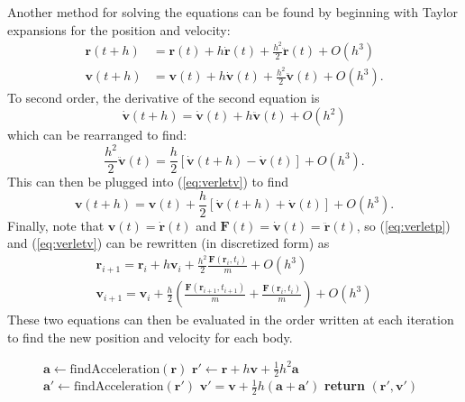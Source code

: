 \documentclass[aps,prc,reprint,nobalancelastpage]{revtex4-1}
\begin{document}
        Another method for solving the equations can be found by beginning with Taylor expansions for the position and velocity:
        \begin{align}
            \mathbf{r}(t+h) &= \mathbf{r}(t) + h \dot{\mathbf{r}}(t) + \frac{h^2}{2}\ddot{\mathbf{r}}(t) + O(h^3) \label{eq:verletp}\\
            \mathbf{v}(t+h) &= \mathbf{v}(t) + h \dot{\mathbf{v}}(t) + \frac{h^2}{2}\ddot{\mathbf{v}}(t) + O(h^3). \label{eq:verletv}
        \end{align}
        To second order, the derivative of the second equation is
        \begin{equation}
            \dot{\mathbf{v}}(t+h) = \dot{\mathbf{v}}(t) + h \ddot{\mathbf{v}}(t) + O(h^2)
        \end{equation}
        which can be rearranged to find:
        \begin{equation}
            \frac{h^2}{2}\ddot{\mathbf{v}}(t) = \frac{h}{2} [\dot{\mathbf{v}}(t+h) - \dot{\mathbf{v}}(t)] + O(h^3).
        \end{equation}
        This can then be plugged into (\ref{eq:verletv}) to find
        \begin{equation}
            \mathbf{v}(t+h) = \mathbf{v}(t) + \frac{h}{2} [\dot{\mathbf{v}}(t+h) + \dot{\mathbf{v}}(t)] + O(h^3).
        \end{equation}
        Finally, note that $\mathbf{v}(t) = \dot{\mathbf{r}}(t)$ and $\mathbf{F}(t) = \dot{\mathbf{v}}(t) = \ddot{\mathbf{r}}(t)$, so (\ref{eq:verletp}) and (\ref{eq:verletv}) can be rewritten (in discretized form) as
        \begin{gather}
            \mathbf{r}_{i+1} = \mathbf{r}_i + h\mathbf{v}_i + \frac{h^2}{2} \frac{\mathbf{F}(\mathbf{r}_i, t_i)}{m} + O(h^3) \\
            \mathbf{v}_{i+1} = \mathbf{v}_i + \frac{h}{2} \left(\frac{\mathbf{F}(\mathbf{r}_{i+1}, t_{i+1})}{m} + \frac{\mathbf{F}(\mathbf{r}_i, t_i)}{m}\right) + O(h^3)
        \end{gather}
        These two equations can then be evaluated in the order written at each iteration to find the new position and velocity for each body.

        \begin{figure}
            \begin{algorithm}[H]
                \begin{algorithmic}
                        \State $\mathbf{a} \gets \text{findAcceleration}(\mathbf{r})$
                        \State $\mathbf{r}' \gets \mathbf{r} + h \mathbf{v} + \frac{1}{2} h^2 \mathbf{a}$
                        \State $\mathbf{a}' \gets \text{findAcceleration}(\mathbf{r}')$
                        \State $\mathbf{v}' = \mathbf{v} + \frac{1}{2} h (\mathbf{a} + \mathbf{a}')$
                        \State \textbf{return} $(\mathbf{r}', \mathbf{v}')$
                    \EndFunction
                \end{algorithmic}
            \end{algorithm}
        \end{figure}
\end{document}
